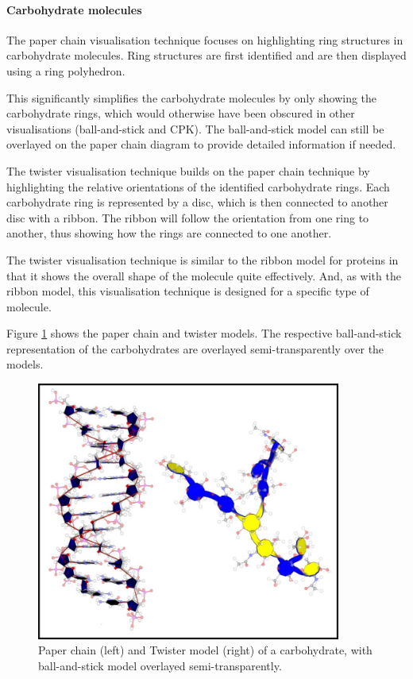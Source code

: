 
\paragraph{Carbohydrate molecules}

The paper chain visualisation technique \citep{kuttel06} focuses on
highlighting ring structures in carbohydrate molecules. Ring structures are
first identified and are then displayed using a ring polyhedron.

This significantly simplifies the carbohydrate molecules by only showing the
carbohydrate rings, which would otherwise have been obscured in other
visualisations (ball-and-stick and CPK). The ball-and-stick model can still be
overlayed on the paper chain diagram to provide detailed information if needed.

The twister visualisation technique \citep{kuttel06} builds on the paper chain
technique by highlighting the relative orientations of the identified
carbohydrate rings. Each carbohydrate ring is represented by a disc, which is
then connected to another disc with a ribbon. The ribbon will follow the
orientation from one ring to another, thus showing how the rings are connected
to one another.

The twister visualisation technique is similar to the ribbon model for proteins
in that it shows the overall shape of the molecule quite effectively. And, as
with the ribbon model, this visualisation technique is designed for a specific
type of molecule.

Figure \ref{fig:background_chain_twister} shows the paper chain and twister
models. The respective ball-and-stick representation of the carbohydrates are
overlayed semi-transparently over the models.

\begin{figure}
  \begin{center}
    \includegraphics[width=100mm]{chain_twister}
  \end{center}
  \caption{Paper chain (left) and Twister model (right) of a carbohydrate, with
  ball-and-stick model overlayed semi-transparently.}
  \label{fig:background_chain_twister}
\end{figure}


